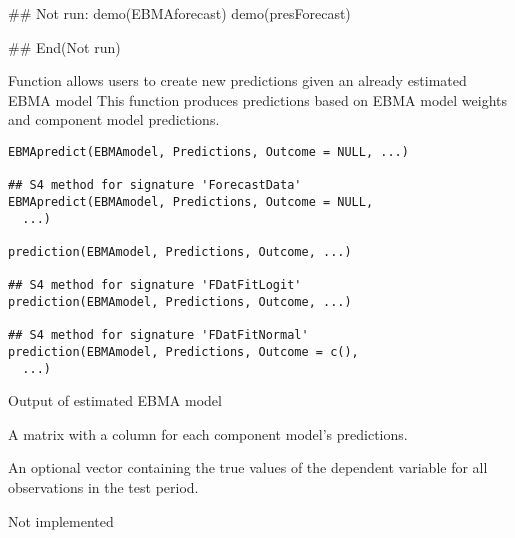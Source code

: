 \documentclass[a4paper]{book}
\begin{document}
%
\begin{Examples}
\begin{ExampleCode}
## Not run: demo(EBMAforecast)
demo(presForecast)

## End(Not run)
\end{ExampleCode}
\end{Examples}
%
\begin{Description}\relax
Function allows users to create new predictions given an already estimated EBMA model
This function produces predictions based on EBMA model weights and component model predictions.
\end{Description}
%
\begin{Usage}
\begin{verbatim}
EBMApredict(EBMAmodel, Predictions, Outcome = NULL, ...)

## S4 method for signature 'ForecastData'
EBMApredict(EBMAmodel, Predictions, Outcome = NULL,
  ...)

prediction(EBMAmodel, Predictions, Outcome, ...)

## S4 method for signature 'FDatFitLogit'
prediction(EBMAmodel, Predictions, Outcome, ...)

## S4 method for signature 'FDatFitNormal'
prediction(EBMAmodel, Predictions, Outcome = c(),
  ...)
\end{verbatim}
\end{Usage}
%
\begin{Arguments}
\begin{ldescription}
\item[\code{EBMAmodel}] Output of estimated EBMA model

\item[\code{Predictions}] A matrix with a column for each component model's predictions.

\item[\code{Outcome}] An optional vector containing the true values of the dependent variable for all observations in the test period.

\item[\code{...}] Not implemented
\end{ldescription}
\end{Arguments}
\end{document}
